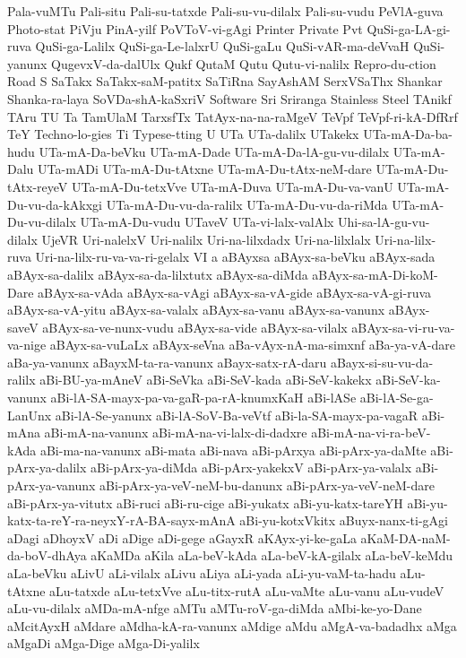 {Pala-vuMTu
Pali-situ
Pali-su-tatxde
Pali-su-vu-dilalx
Pali-su-vudu
PeVlA-guva
Photo-stat
PiVju
PinA-yilf
PoVToV-vi-gAgi
Printer
Private
Pvt
QuSi-ga-LA-gi-ruva
QuSi-ga-Lalilx
QuSi-ga-Le-lalxrU
QuSi-gaLu
QuSi-vAR-ma-deVvaH
QuSi-yanunx
QugevxV-da-dalUlx
Qukf
QutaM
Qutu
Qutu-vi-nalilx
Repro-du-ction
Road
S
SaTakx
SaTakx-saM-patitx
SaTiRna
SayAshAM
SerxVSaThx
Shankar
Shanka-ra-laya
SoVDa-shA-kaSxriV
Software
Sri
Sriranga
Stainless
Steel
TAnikf
TAru
TU
Ta
TamUlaM
TarxsfTx
TatAyx-na-na-raMgeV
TeVpf
TeVpf-ri-kA-DfRrf
TeY
Techno-lo-gies
Ti
Typese-tting
U
UTa
UTa-dalilx
UTakekx
UTa-mA-Da-ba-hudu
UTa-mA-Da-beVku
UTa-mA-Dade
UTa-mA-Da-lA-gu-vu-dilalx
UTa-mA-Dalu
UTa-mADi
UTa-mA-Du-tAtxne
UTa-mA-Du-tAtx-neM-dare
UTa-mA-Du-tAtx-reyeV
UTa-mA-Du-tetxVve
UTa-mA-Duva
UTa-mA-Du-va-vanU
UTa-mA-Du-vu-da-kAkxgi
UTa-mA-Du-vu-da-ralilx
UTa-mA-Du-vu-da-riMda
UTa-mA-Du-vu-dilalx
UTa-mA-Du-vudu
UTaveV
UTa-vi-lalx-valAlx
Uhi-sa-lA-gu-vu-dilalx
UjeVR
Uri-nalelxV
Uri-nalilx
Uri-na-lilxdadx
Uri-na-lilxlalx
Uri-na-lilx-ruva
Uri-na-lilx-ru-va-va-ri-gelalx
VI
a
aBAyxsa
aBAyx-sa-beVku
aBAyx-sada
aBAyx-sa-dalilx
aBAyx-sa-da-lilxtutx
aBAyx-sa-diMda
aBAyx-sa-mA-Di-koM-Dare
aBAyx-sa-vAda
aBAyx-sa-vAgi
aBAyx-sa-vA-gide
aBAyx-sa-vA-gi-ruva
aBAyx-sa-vA-yitu
aBAyx-sa-valalx
aBAyx-sa-vanu
aBAyx-sa-vanunx
aBAyx-saveV
aBAyx-sa-ve-nunx-vudu
aBAyx-sa-vide
aBAyx-sa-vilalx
aBAyx-sa-vi-ru-va-va-nige
aBAyx-sa-vuLaLx
aBAyx-seVna
aBa-vAyx-nA-ma-simxnf
aBa-ya-vA-dare
aBa-ya-vanunx
aBayxM-ta-ra-vanunx
aBayx-satx-rA-daru
aBayx-si-su-vu-da-ralilx
aBi-BU-ya-mAneV
aBi-SeVka
aBi-SeV-kada
aBi-SeV-kakekx
aBi-SeV-ka-vanunx
aBi-lA-SA-mayx-pa-va-gaR-pa-rA-knumxKaH
aBi-lASe
aBi-lA-Se-ga-LanUnx
aBi-lA-Se-yanunx
aBi-lA-SoV-Ba-veVtf
aBi-la-SA-mayx-pa-vagaR
aBi-mAna
aBi-mA-na-vanunx
aBi-mA-na-vi-lalx-di-dadxre
aBi-mA-na-vi-ra-beV-kAda
aBi-ma-na-vanunx
aBi-mata
aBi-nava
aBi-pArxya
aBi-pArx-ya-daMte
aBi-pArx-ya-dalilx
aBi-pArx-ya-diMda
aBi-pArx-yakekxV
aBi-pArx-ya-valalx
aBi-pArx-ya-vanunx
aBi-pArx-ya-veV-neM-bu-danunx
aBi-pArx-ya-veV-neM-dare
aBi-pArx-ya-vitutx
aBi-ruci
aBi-ru-cige
aBi-yukatx
aBi-yu-katx-tareYH
aBi-yu-katx-ta-reY-ra-neyxY-rA-BA-sayx-mAnA
aBi-yu-kotxVkitx
aBuyx-nanx-ti-gAgi
aDagi
aDhoyxV
aDi
aDige
aDi-gege
aGayxR
aKAyx-yi-ke-gaLa
aKaM-DA-naM-da-boV-dhAya
aKaMDa
aKila
aLa-beV-kAda
aLa-beV-kA-gilalx
aLa-beV-keMdu
aLa-beVku
aLivU
aLi-vilalx
aLivu
aLiya
aLi-yada
aLi-yu-vaM-ta-hadu
aLu-tAtxne
aLu-tatxde
aLu-tetxVve
aLu-titx-rutA
aLu-vaMte
aLu-vanu
aLu-vudeV
aLu-vu-dilalx
aMDa-mA-nfge
aMTu
aMTu-roV-ga-diMda
aMbi-ke-yo-Dane
aMcitAyxH
aMdare
aMdha-kA-ra-vanunx
aMdige
aMdu
aMgA-va-badadhx
aMga
aMgaDi
aMga-Dige
aMga-Di-yalilx
}
